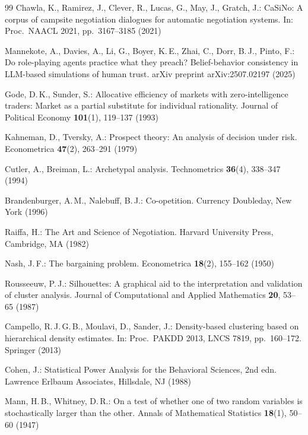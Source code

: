 \documentclass[11pt,a4paper]{article}
\begin{document}
\begin{thebibliography}{99}
Chawla, K., Ramirez, J., Clever, R., Lucas, G., May, J., Gratch, J.:
CaSiNo: A corpus of campsite negotiation dialogues for automatic
negotiation systems.
In: Proc.\ NAACL 2021, pp.~3167--3185 (2021)

Mannekote, A., Davies, A., Li, G., Boyer, K.\,E., Zhai, C., Dorr, B.\,J.,
Pinto, F.:
Do role-playing agents practice what they preach? Belief-behavior
consistency in LLM-based simulations of human trust.
arXiv preprint arXiv:2507.02197 (2025)

Gode, D.\,K., Sunder, S.:
Allocative efficiency of markets with zero-intelligence traders: Market
as a partial substitute for individual rationality.
Journal of Political Economy \textbf{101}(1), 119--137 (1993)

Kahneman, D., Tversky, A.:
Prospect theory: An analysis of decision under risk.
Econometrica \textbf{47}(2), 263--291 (1979)

Cutler, A., Breiman, L.:
Archetypal analysis.
Technometrics \textbf{36}(4), 338--347 (1994)

Brandenburger, A.\,M., Nalebuff, B.\,J.:
Co-opetition.
Currency Doubleday, New York (1996)

Raiffa, H.:
The Art and Science of Negotiation.
Harvard University Press, Cambridge, MA (1982)

Nash, J.\,F.:
The bargaining problem.
Econometrica \textbf{18}(2), 155--162 (1950)

Rousseeuw, P.\,J.:
Silhouettes: A graphical aid to the interpretation and validation of
cluster analysis.
Journal of Computational and Applied Mathematics \textbf{20}, 53--65
(1987)

Campello, R.\,J.\,G.\,B., Moulavi, D., Sander, J.:
Density-based clustering based on hierarchical density estimates.
In: Proc.\ PAKDD 2013, LNCS 7819, pp.~160--172. Springer (2013)

Cohen, J.:
Statistical Power Analysis for the Behavioral Sciences, 2nd edn.
Lawrence Erlbaum Associates, Hillsdale, NJ (1988)

Mann, H.\,B., Whitney, D.\,R.:
On a test of whether one of two random variables is stochastically
larger than the other.
Annals of Mathematical Statistics \textbf{18}(1), 50--60 (1947)


\end{thebibliography}
\end{document}
